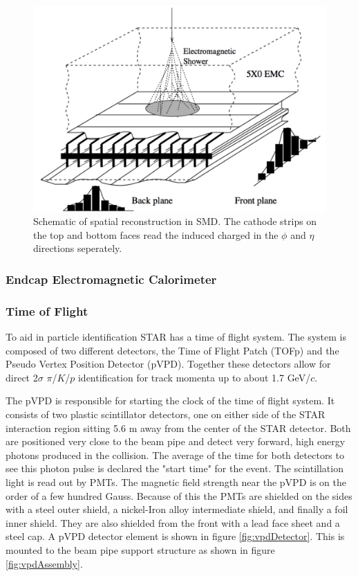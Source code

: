 \documentclass[abstract = on,listof=totoc, bibliography=totoc]{scrreprt}
\begin{document}
\begin{figure}
\begin{center}
\includegraphics[width = .6\textwidth]{SMD1}
\caption[Spatial reconstruction in the SMD]{Schematic of spatial reconstruction in SMD. The cathode strips on the top and bottom faces read the induced charged in the $\phi$ and $\eta$ directions seperately.}
\label{fig:SMD1}
\end{center}
\end{figure}




\FloatBarrier
\subsubsection[EEMC]{Endcap Electromagnetic Calorimeter}

\subsubsection[TOF]{Time of Flight}

To aid in particle identification STAR has a time of flight system. The system is composed of two different detectors, the Time of Flight Patch (TOFp) and the Pseudo Vertex Position Detector (pVPD).  Together these detectors allow for direct 2$\sigma$ $\pi$/$K$/$p$ identification for track momenta up to about 1.7 GeV/$c$.

The pVPD is responsible for starting the clock of the time of flight system. It consists of two plastic scintillator detectors, one on either side of the STAR interaction region sitting 5.6 m away from the center of the STAR detector. Both are positioned very close to the beam pipe and detect very forward, high energy photons produced in the collision. The average of the time for both detectors to see this photon pulse is declared the "start time" for the event. The scintillation light is read out by PMTs. The magnetic field strength near the pVPD is on the order of a few hundred Gauss. Because of this the PMTs are shielded on the sides with a steel outer shield, a nickel-Iron alloy intermediate shield, and finally a foil inner shield. They are also shielded from the front with a lead face sheet and a steel cap. A pVPD detector element is shown in figure \ref{fig:vpdDetector}. This is mounted to the beam pipe support structure as shown in figure \ref{fig:vpdAssembly}.    
\end{document}
